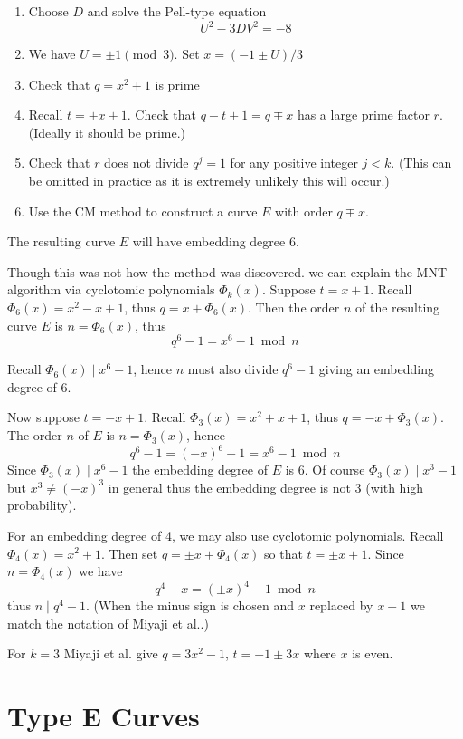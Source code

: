 \begin{enumerate}
\item
Choose $D$ and solve the Pell-type equation
\[ U^2 - 3DV^2 = -8 \]
\item
We have $U = \pm 1 \pmod 3$. Set $x = (-1 \pm U) / 3$
\item
Check that $q = x^2 + 1$ is prime
\item
Recall $t = \pm x + 1$.
Check that $q - t + 1 = q \mp x$ has a large prime factor $r$.
(Ideally it should be prime.)
\item
Check that $r$ does not divide $q^j = 1$ for any positive integer $j < k$.
(This can be omitted in practice as it is extremely unlikely this will
occur.)
\item
Use the CM method to construct a curve $E$ with order $q \mp x$.
\end{enumerate}

The resulting curve $E$ will have embedding degree 6.

Though this was not how the method was discovered.
we can explain the MNT algorithm via cyclotomic polynomials $\Phi_k(x)$.
Suppose $t = x + 1$.
Recall $\Phi_6(x) = x^2 - x + 1$, thus
$q = x + \Phi_6(x)$.
Then the order $n$ of the resulting
curve $E$ is $n = \Phi_6(x)$, thus
\[ q^6 - 1 = x^6 - 1 \bmod n \]

Recall $\Phi_6(x) \mid x^6 - 1$, hence $n$ must also divide $q^6 - 1$
giving an embedding degree of 6.

Now suppose $t = -x + 1$.
Recall $\Phi_3(x) = x^2 + x + 1$, thus
$q = -x + \Phi_3(x)$.
The order $n$ of $E$ is $n = \Phi_3(x)$, hence
\[ q^6 - 1 = (-x)^6 - 1 = x^6 - 1 \bmod n \]
Since $\Phi_3(x) \mid x^6 - 1$ the embedding degree of $E$ is 6.
Of course $\Phi_3(x) \mid x^3 - 1$ but $x^3 \ne (-x)^3$ in general
thus the embedding degree is not 3 (with high probability).

For an embedding degree of 4, we may also use cyclotomic polynomials.
Recall $\Phi_4(x) = x^2 + 1$. Then set $q = \pm x + \Phi_4(x)$
so that $t = \pm x + 1$. Since $n = \Phi_4(x)$ we have
\[ q^4 - x = (\pm x)^4 - 1 \bmod n \]
thus $n \mid q^4 - 1$.
(When the minus sign is chosen and $x$ replaced by $x+1$ 
we match the notation of Miyaji et al.\cite{mnt}.)

For $k=3$ Miyaji et al. give $q = 3 x^2 - 1$, $t = -1 \pm 3x$ where $x$ is
even.

\section {Type E Curves}

